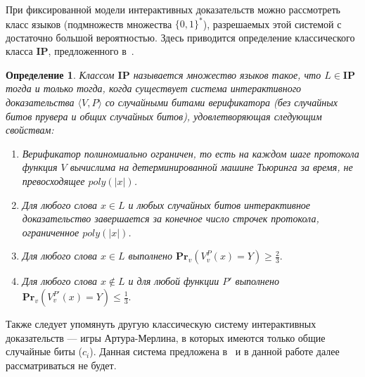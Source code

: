 \documentclass[14pt, a4paper]{extreport}
\newtheorem{definition}{\indent Определение}
\newcommand{\word}{\{0, 1\}^*}
\newcommand{\poly}{\textit{poly}}
\newcommand{\pr}[2]{\textbf{Pr}_{#1}\left(#2\right)}
\begin{document}
При фиксированной модели интерактивных доказательств можно рассмотреть класс языков (подмножеств множества $\word$), разрешаемых этой системой с достаточно большой вероятностью. Здесь приводится определение классического класса $\textbf{IP}$, предложенного в~\cite{goldwasser1989ip}.
\begin{definition}\label{ip}
    Классом $\textbf{IP}$ называется множество языков такое, что $L \in \textbf{IP}$ тогда и только тогда, когда существует система интерактивного доказательства $\langle V, P\rangle$ со случайными битами верификатора (без случайных битов прувера и общих случайных битов), удовлетворяющая следующим свойствам:
    \begin{enumerate}
        \item Верификатор полиномиально ограничен, то есть на каждом шаге протокола функция $V$ вычислима на детерминированной машине Тьюринга за время, не превосходящее $\poly(|x|)$.
        \item Для любого слова $x \in L$ и любых случайных битов интерактивное доказательство завершается за конечное число строчек протокола, ограниченное $\poly(|x|)$.
        \item Для любого слова $x \in L$ выполнено $\pr{v}{V^P_{v}(x) = Y} \geqslant \frac{2}{3}.$
        \item Для любого слова $x \notin L$ и для любой функции $P'$ выполнено\\$\pr{v}{V^{P'}_{v}(x) = Y} \leqslant \frac{1}{3}.$
    \end{enumerate}
\end{definition}
Также следует упомянуть другую классическую систему интерактивных доказательств --- игры Артура-Мерлина, в которых имеются только общие случайные биты ($c_{i}$). Данная система предложена в~\cite{babai1988arthur} и в данной работе далее рассматриваться не будет.
\end{document}
